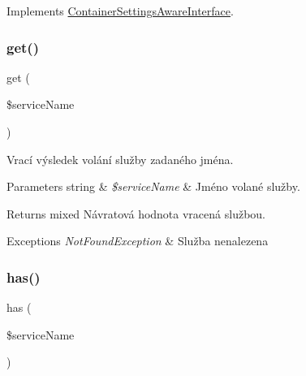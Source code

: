 Implements \mbox{\hyperlink{interface_pes_1_1_container_1_1_container_settings_aware_interface_af120db1d78ad428681293ca220675616}{Container\+Settings\+Aware\+Interface}}.

\mbox{\label{class_pes_1_1_container_1_1_container_a1a84a087ff94c2fb4af5e4b25d2b2d53}} 
\subsubsection{\texorpdfstring{get()}{get()}}
{\footnotesize\ttfamily get (\begin{DoxyParamCaption}\item[{}]{\$service\+Name }\end{DoxyParamCaption})}

Vrací výsledek volání služby zadaného jména.


\begin{DoxyParams}[1]{Parameters}
string & {\em \$service\+Name} & Jméno volané služby. \\
\hline
\end{DoxyParams}
\begin{DoxyReturn}{Returns}
mixed Návratová hodnota vracená službou. 
\end{DoxyReturn}

\begin{DoxyExceptions}{Exceptions}
{\em Not\+Found\+Exception} & Služba nenalezena \\
\hline
\end{DoxyExceptions}
\mbox{\label{class_pes_1_1_container_1_1_container_a91d786bf5e60430567a9de84ebbcbfdd}} 
\subsubsection{\texorpdfstring{has()}{has()}}
{\footnotesize\ttfamily has (\begin{DoxyParamCaption}\item[{}]{\$service\+Name }\end{DoxyParamCaption})}

